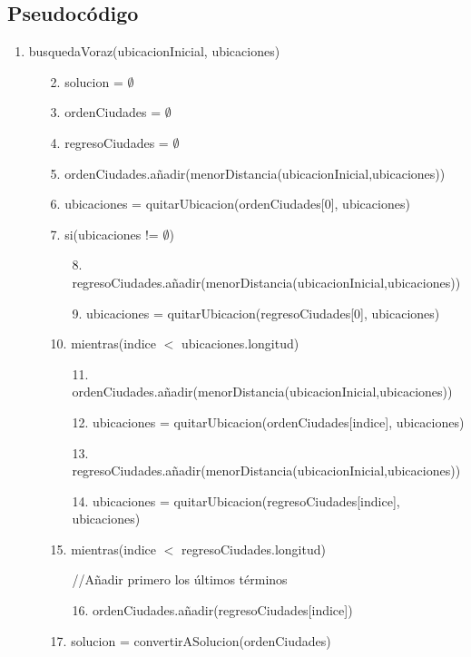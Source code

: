 \documentclass[10pt]{report}
\begin{document}
\subsection*{Pseudocódigo}
\begin{enumerate}

\item busquedaVoraz(ubicacionInicial, ubicaciones)
\begin{enumerate}

\item[2.] solucion = $\emptyset$

\item[3.] ordenCiudades = $\emptyset$

\item[4.] regresoCiudades = $\emptyset$

\item[5.] ordenCiudades.añadir(menorDistancia(ubicacionInicial,ubicaciones))

\item[6.] ubicaciones = quitarUbicacion(ordenCiudades[0], ubicaciones)

\item[7.] si(ubicaciones != $\emptyset$)

\begin{enumerate}
\item[8.] regresoCiudades.añadir(menorDistancia(ubicacionInicial,ubicaciones))

\item[9.] ubicaciones = quitarUbicacion(regresoCiudades[0], ubicaciones)
\end{enumerate}
\item[10.] mientras(indice $<$ ubicaciones.longitud)
\begin{enumerate}
\item[11.] ordenCiudades.añadir(menorDistancia(ubicacionInicial,ubicaciones))

\item[12.] ubicaciones = quitarUbicacion(ordenCiudades[indice], ubicaciones)

\item[13.] regresoCiudades.añadir(menorDistancia(ubicacionInicial,ubicaciones))

\item[14.] ubicaciones = quitarUbicacion(regresoCiudades[indice], ubicaciones)
\end{enumerate}
\item[15.] mientras(indice $<$ regresoCiudades.longitud)
\begin{enumerate}
\item[] //Añadir primero los últimos términos
\item[16.] ordenCiudades.añadir(regresoCiudades[indice])
\end{enumerate}
\item[17.] solucion = convertirASolucion(ordenCiudades)
\end{enumerate}
\end{enumerate}
\end{document}
